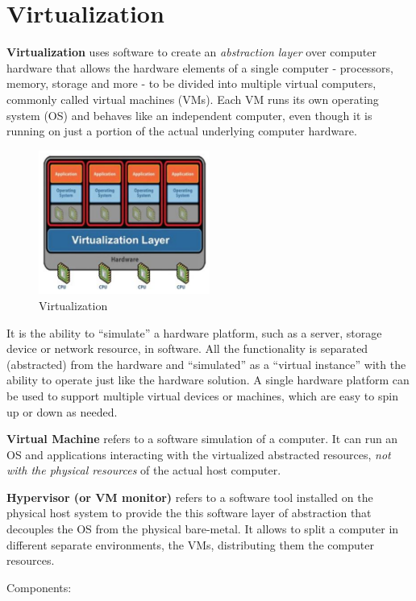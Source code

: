 
\chapter{Virtualization}

\textbf{Virtualization} uses software to create an \textit{abstraction layer} over computer hardware that allows the hardware elements of a single computer - processors, memory, storage and more - to be divided into multiple virtual computers, commonly called virtual machines (VMs). Each VM runs its own operating system (OS) and behaves like an independent computer, even though it is running on just a portion of the actual underlying computer hardware. 
\begin{figure}[H]
    \centering
    \includegraphics[width=0.5\textwidth]{assets/fig27.png}
    \caption{Virtualization}
\end{figure}

It is the ability to “simulate” a hardware platform, such as a server,
storage device or network resource, in software. All the functionality is separated
(abstracted) from the hardware and “simulated” as a “virtual instance” with the ability to
operate just like the hardware solution. A single hardware platform can be used to support
multiple virtual devices or machines, which are easy to spin up or down as needed.

\textbf{Virtual Machine} refers to a software simulation of a computer. It can run an OS and applications interacting with the virtualized abstracted resources, \textit{not with the physical resources} of the actual host computer.

\textbf{Hypervisor (or VM monitor)} refers to a software tool installed on the physical host system to provide the this software layer of abstraction that decouples the OS from the physical bare-metal. It allows to split a computer in different separate environments, the VMs, distributing them the computer resources. 

Components:


